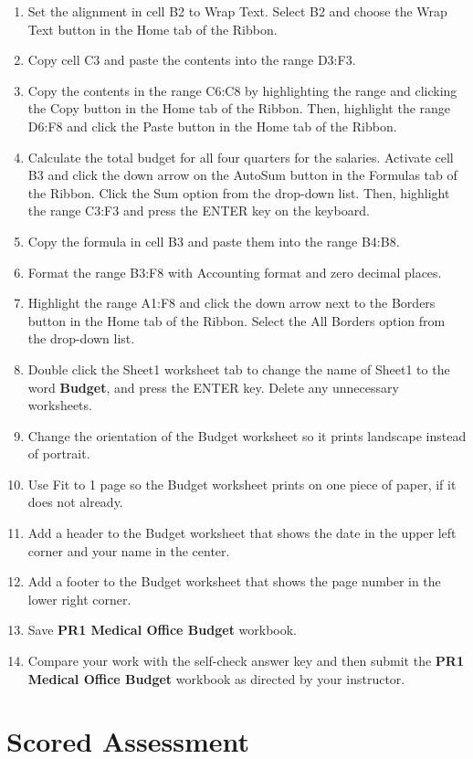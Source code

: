 \begin{enumerate}[resume]
	\item Set the alignment in cell \textsf{B2} to Wrap Text. Select \textsf{B2} and choose the Wrap Text button in the Home tab of the Ribbon.
	\item Copy cell \textsf{C3} and paste the contents into the range \textsf{D3:F3}.
	\item Copy the contents in the range \textsf{C6:C8} by highlighting the range and clicking the Copy button in the Home tab of the Ribbon. Then, highlight the range \textsf{D6:F8} and click the Paste button in the Home tab of the Ribbon.
	\item Calculate the total budget for all four quarters for the salaries. Activate cell \textsf{B3} and click the down arrow on the AutoSum button in the Formulas tab of the Ribbon. Click the Sum option from the drop-down list. Then, highlight the range \textsf{C3:F3} and press the ENTER key on the keyboard.
	\item Copy the formula in cell \textsf{B3} and paste them into the range \textsf{B4:B8}.
	\item Format the range \textsf{B3:F8} with Accounting format and zero decimal places.
	\item Highlight the range \textsf{A1:F8} and click the down arrow next to the Borders button in the Home tab of the Ribbon. Select the All Borders option from the drop-down list.
	\item Double click the Sheet1 worksheet tab to change the name of Sheet1 to the word \textbf{Budget}, and press the ENTER key. Delete any unnecessary worksheets.
	\item Change the orientation of the Budget worksheet so it prints landscape instead of portrait.
	\item Use Fit to 1 page so the Budget worksheet prints on one piece of paper, if it does not already.
	\item Add a header to the Budget worksheet that shows the date in the upper left corner and your name in the center.
	\item Add a footer to the Budget worksheet that shows the page number in the lower right corner. 
	\item Save \textbf{PR1 Medical Office Budget} workbook.
	\item Compare your work with the self-check answer key and then submit the \textbf{PR1 Medical Office Budget} workbook as directed by your instructor.
\end{enumerate}

\section{Scored Assessment}

